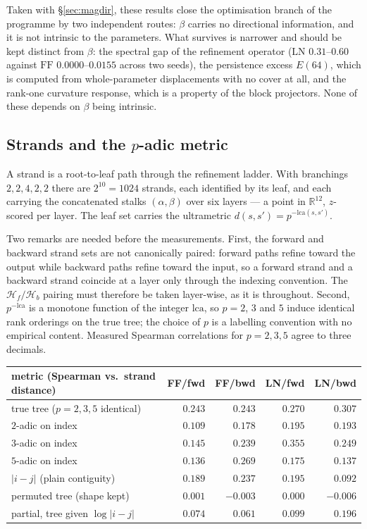 Taken with \S\ref{sec:magdir}, these results close the optimisation branch of
the programme by two independent routes: $\beta$ carries no directional
information, and it is not intrinsic to the parameters. What survives is
narrower and should be kept distinct from $\beta$: the spectral gap of the
refinement operator ($\mathrm{LN}$ $0.31$--$0.60$ against $\mathrm{FF}$
$0.0000$--$0.0155$ across two seeds), the persistence excess $E(64)$, which is
computed from whole-parameter displacements with no cover at all, and the
rank-one curvature response, which is a property of the block projectors. None
of these depends on $\beta$ being intrinsic.

\subsection{Strands and the \texorpdfstring{$p$}{p}-adic metric}
\label{sec:strands}

A strand is a root-to-leaf path through the refinement ladder. With branchings
$2,2,4,2,2$ there are $2^{10}=1024$ strands, each identified by its leaf, and
each carrying the concatenated stalks $(\alpha,\beta)$ over six layers ---
a point in $\mathbb{R}^{12}$, $z$-scored per layer. The leaf set carries the
ultrametric $d(s,s') = p^{-\mathrm{lca}(s,s')}$.

Two remarks are needed before the measurements. First, the forward and backward
strand sets are not canonically paired: forward paths refine toward the output
while backward paths refine toward the input, so a forward strand and a
backward strand coincide at a layer only through the indexing convention. The
$\mathcal{H}_f/\mathcal{H}_b$ pairing must therefore be taken layer-wise, as it
is throughout. Second, $p^{-\mathrm{lca}}$ is a monotone function of the integer
$\mathrm{lca}$, so $p=2$, $3$ and $5$ induce identical rank orderings on the
true tree; the choice of $p$ is a labelling convention with no empirical
content. Measured Spearman correlations for $p = 2,3,5$ agree to three decimals.

\begin{center}
\begin{tabular}{lrrrr}
\toprule
metric (Spearman vs.\ strand distance) & FF/fwd & FF/bwd & LN/fwd & LN/bwd \\
\midrule
true tree ($p=2,3,5$ identical)  & $0.243$ & $0.243$ & $0.270$ & $0.307$ \\
$2$-adic on index                & $0.109$ & $0.178$ & $0.195$ & $0.193$ \\
$3$-adic on index                & $0.145$ & $0.239$ & $0.355$ & $0.249$ \\
$5$-adic on index                & $0.136$ & $0.269$ & $0.175$ & $0.137$ \\
$|i-j|$ (plain contiguity)       & $0.189$ & $0.237$ & $0.195$ & $0.092$ \\
permuted tree (shape kept)       & $0.001$ & $-0.003$ & $0.000$ & $-0.006$ \\
partial, tree given $\log|i-j|$  & $0.074$ & $0.061$ & $0.099$ & $0.196$ \\
\bottomrule
\end{tabular}
\end{center}

